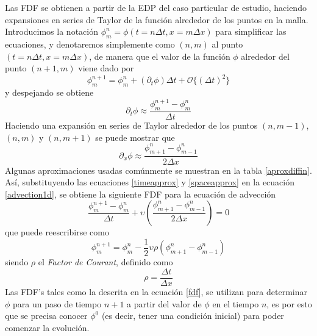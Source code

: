 \documentclass[11pt,twoside,openright,spanish]{report}
\numberwithin{equation}{chapter}
\numberwithin{figure}{chapter}
\numberwithin{table}{chapter}
\begin{document}
Las FDF se obtienen a partir de la EDP del caso particular de estudio, haciendo expansiones en series de Taylor de la función alrededor de los puntos en la malla. Introducimos la notación $\phi^n_m=\phi(t=n\Delta t,x=m\Delta x)$ para simplificar las ecuaciones, y denotaremos simplemente como $(n,m)$ al punto $(t=n\Delta t, x=m\Delta x)$, de manera que el valor de la función $\phi$ alrededor del punto $(n+1,m)$ viene dado por
\begin{equation}
\phi^{n+1}_m=\phi^n_m+\left(\partial_t\phi\right)\Delta t+\mathcal{O}\{\left(\Delta t\right)^2\}
\end{equation}
y despejando se obtiene
\begin{equation}
\partial_t\phi\approx\frac{\phi^{n+1}_m-\phi^n_m}{\Delta t}
\label{timeapprox}
\end{equation}
Haciendo una expansión en series de Taylor alrededor de los puntos $(n,m-1)$, $(n,m)$ y $(n,m+1)$ se puede mostrar que
\begin{equation}
\partial_x\phi\approx\frac{\phi^n_{m+1}-\phi^n_{m-1}}{2\Delta x}
\label{spaceapprox}
\end{equation}
Algunas aproximaciones usadas comúnmente se muestran en la tabla \ref{aproxdiffin}. Así, substituyendo las ecuaciones \eqref{timeapprox} y \eqref{spaceapprox} en la ecuación \eqref{advection1d}, se obtiene la siguiente FDF para la ecuación de advección
\begin{equation}
\frac{\phi_m^{n+1}-\phi_m^n}{\Delta t}+\upsilon\left(\frac{\phi^n_{m+1}-\phi^n_{m-1}}{2\Delta x}\right)=0
\end{equation}
que puede reescribirse como
\begin{equation}
\phi_m^{n+1}=\phi_m^n-\frac{1}{2}\upsilon\rho\left(\phi^n_{m+1}-\phi^n_{m-1}\right)
\label{fdf}
\end{equation}
siendo $\rho$ el \textit{Factor de Courant}, definido como
\begin{equation}
\rho=\frac{\Delta t}{\Delta x}
\end{equation}
Las FDF's tales como la descrita en la ecuación \eqref{fdf}, se utilizan para determinar $\phi$ para un paso de tiempo $n+1$ a partir del valor de $\phi$ en el tiempo $n$, es por esto que se precisa conocer $\phi^0$ (es decir, tener una condición inicial) para poder comenzar la evolución.
\end{document}
